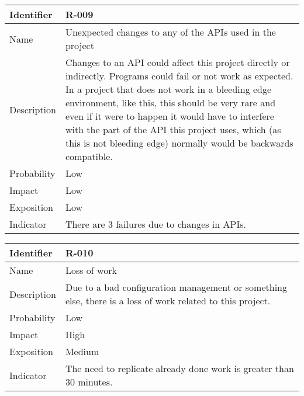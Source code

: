 \begin{table}[H]
	\begin{tabularx}{\textwidth}{|l|X|}
		\hline
		\rowcolor{gray!30}
		Identifier & \textbf{R-009} \\ \hline
		Name & Unexpected changes to any of the APIs used in the project\\ \hline
		Description & Changes to an API could affect this project directly or indirectly. Programs could fail or not work as expected.
		In a project that does not work in a bleeding edge environment, like this, this should be very rare and even if it were to happen it would have to interfere with the part of the API this project uses, which (as this is not bleeding edge) normally would be backwards compatible.\\ \hline
		Probability & Low\\ \hline
		Impact & Low \\ \hline
		Exposition &  Low\\ \hline
		Indicator & There are 3 failures due to changes in APIs.\\ \hline
	\end{tabularx}
\end{table}
\begin{table}[H]
	\begin{tabularx}{\textwidth}{|l|X|}
		\hline
		\rowcolor{gray!30}
		Identifier & \textbf{R-010} \\ \hline
		Name & Loss of work\\ \hline
		Description & Due to a bad configuration management or something else, there is a loss of work related to this project.\\ \hline
		Probability & Low\\ \hline
		Impact &  High\\ \hline
		Exposition &  Medium\\ \hline
		Indicator & The need to replicate already done work is greater than 30 minutes.\\ \hline
	\end{tabularx}
\end{table}
